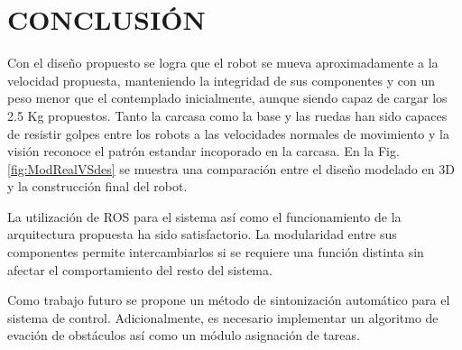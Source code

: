 \documentclass[twocolumn,10pt]{amrob}
\begin{document}

\section*{CONCLUSIÓN}
Con el diseño propuesto se logra que el robot se mueva aproximadamente a la velocidad propuesta, manteniendo la integridad de sus componentes y con un peso menor que el contemplado inicialmente, aunque siendo capaz de cargar los 2.5 Kg propuestos. Tanto la carcasa como la base y las ruedas han sido capaces de resistir golpes entre los robots a las velocidades normales de movimiento y la visión reconoce el patrón estandar incoporado en la carcasa. En la Fig. \ref{fig:ModRealVSdes} se muestra una comparación entre el diseño modelado en 3D y la construcción final del robot.\par 
La utilización de ROS para el sistema así como el funcionamiento de la arquitectura propuesta ha sido satisfactorio. La modularidad entre sus componentes permite intercambiarlos si se requiere una función distinta sin afectar el comportamiento del resto del sistema. \par
Como trabajo futuro se propone un método de sintonización automático para el sistema de control. Adicionalmente, es necesario implementar un algoritmo de evación de obstáculos así como un módulo asignación de tareas. \par





\end{document}
